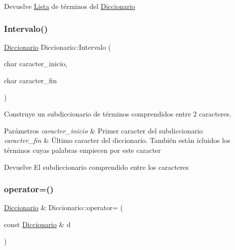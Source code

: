 \begin{DoxyReturn}{Devuelve}
\mbox{\hyperlink{classLista}{Lista}} de términos del \mbox{\hyperlink{classDiccionario}{Diccionario}} 
\end{DoxyReturn}
\mbox{\label{classDiccionario_a29730154b15bac2457f116b354635fae}} 
\subsubsection{\texorpdfstring{Intervalo()}{Intervalo()}}
{\footnotesize\ttfamily \mbox{\hyperlink{classDiccionario}{Diccionario}} Diccionario\+::\+Intervalo (\begin{DoxyParamCaption}\item[{char}]{caracter\+\_\+inicio,  }\item[{char}]{caracter\+\_\+fin }\end{DoxyParamCaption})}



Construye un subdiccionario de términos comprendidos entre 2 caracteres. 


\begin{DoxyParams}{Parámetros}
{\em caracter\+\_\+inicio} & Primer caracter del subdiccionario \\
\hline
{\em caracter\+\_\+fin} & Último caracter del diccionario. También están icluidos los términos cuyas palabras empiecen por este caracter \\
\hline
\end{DoxyParams}
\begin{DoxyReturn}{Devuelve}
El subdiccionario comprendido entre los caracteres 
\end{DoxyReturn}
\mbox{\label{classDiccionario_aa3c1919f74aab0483e3a484f0a708e07}} 
\subsubsection{\texorpdfstring{operator=()}{operator=()}}
{\footnotesize\ttfamily \mbox{\hyperlink{classDiccionario}{Diccionario}} \& Diccionario\+::operator= (\begin{DoxyParamCaption}\item[{const \mbox{\hyperlink{classDiccionario}{Diccionario}} \&}]{d }\end{DoxyParamCaption})}



